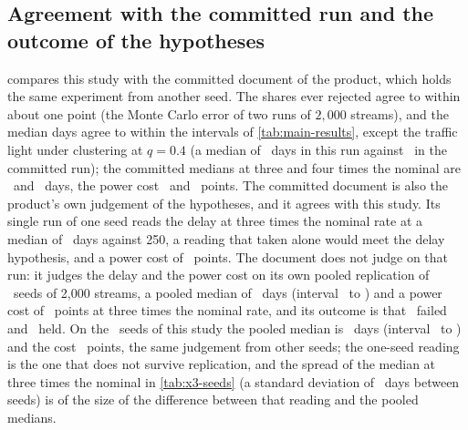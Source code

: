 \subsection{Agreement with the committed run and the outcome of the hypotheses}
\label{sec:results-agreement}

 compares this study with the committed document of the product, which holds the same experiment from another seed. The shares ever rejected agree to within about one point (the Monte Carlo error of two runs of $2{,}000$ streams), and the median days agree to within the intervals of \cref{tab:main-results}, except the traffic light under clustering at $q=0.4$ (a median of \nCluMedFourTenthLight\ days in this run against \nCommittedCluMedFourTenthLight\ in the committed run); the committed medians at three and four times the nominal are \nCommittedMedThree\ and \nCommittedMedFour\ days, the power cost \nCommittedCostThree\ and \nCommittedCostFour\ points.
The committed document is also the product's own judgement of the hypotheses, and it agrees with this study. Its single run of one seed reads the delay at three times the nominal rate at a median of \nCommittedMedThree\ days against 250, a reading that taken alone would meet the delay hypothesis, and a power cost of \nCommittedCostThree\ points. The document does not judge on that run: it judges the delay and the power cost on its own pooled replication of \nCommittedRepSeeds\ seeds of 2,000 streams, a pooled median of \nCommittedPooledMedThree\ days (interval \nCommittedPooledMedThreeLo\ to \nCommittedPooledMedThreeHi) and a power cost of \nCommittedPooledCostThree\ points at three times the nominal rate, and its outcome is that \nCommittedFailed\ failed and \nCommittedHeld\ held. On the \nSeedsCount\ seeds of this study the pooled median is \nSeedsThreeMed\ days (interval \nSeedsThreeMedLo\ to \nSeedsThreeMedHi) and the cost \nSeedsThreeCost\ points, the same judgement from other seeds; the one-seed reading is the one that does not survive replication, and the spread of the median at three times the nominal in \cref{tab:x3-seeds} (a standard deviation of \nSeedsThreeSeedSd\ days between seeds) is of the size of the difference between that reading and the pooled medians.



